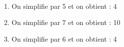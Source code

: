    \ \\ [-5mm]
   \begin{enumerate}
      \item On simplifie par 5 et on obtient { : 4}
      \item On simplifie par 7 et on obtient { : 10}
      \item On simplifie par 6 et on obtient { : 4}
   \end{enumerate}
